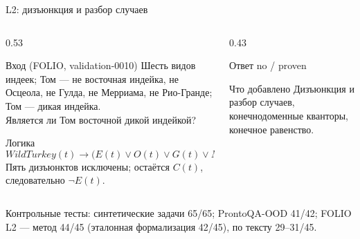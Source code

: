\documentclass[aspectratio=169,11pt]{beamer}
\newcommand{\Prov}[1]{\textcolor{provencolor}{#1}}
\begin{document}
\begin{frame}[shrink=5]{L2: дизъюнкция и разбор случаев}
  \footnotesize
  \begin{columns}[T,onlytextwidth]
    \begin{column}{0.53\textwidth}
      \begin{block}{Вход (FOLIO, validation-0010)}
        Шесть видов индеек; Том — не восточная индейка, не Осцеола,
        не Гулда, не Мерриама, не Рио-Гранде; Том — дикая индейка.\\[1mm]
        Является ли Том восточной дикой индейкой?
      \end{block}
      \begin{block}{Логика}
        \[
          \mathit{WildTurkey}(t)\to
          \bigl(E(t)\lor O(t)\lor G(t)\lor M(t)\lor R(t)\lor C(t)\bigr)
        \]
        Пять дизъюнктов исключены; остаётся \(C(t)\),
        следовательно \(\neg E(t)\).
      \end{block}
    \end{column}
    \begin{column}{0.43\textwidth}
      \begin{block}{Ответ}
        \Prov{no / proven}
      \end{block}
      \begin{block}{Что добавлено}
        Дизъюнкция и разбор случаев, конечнодоменные кванторы,
        конечное равенство.
      \end{block}
    \end{column}
  \end{columns}

  \vspace{1mm}
  {\scriptsize Контрольные тесты: синтетические задачи 65/65;
  ProntoQA-OOD 41/42; FOLIO L2 --- метод 44/45 (эталонная формализация
  42/45), по тексту 29--31/45.}
\end{frame}
\end{document}
